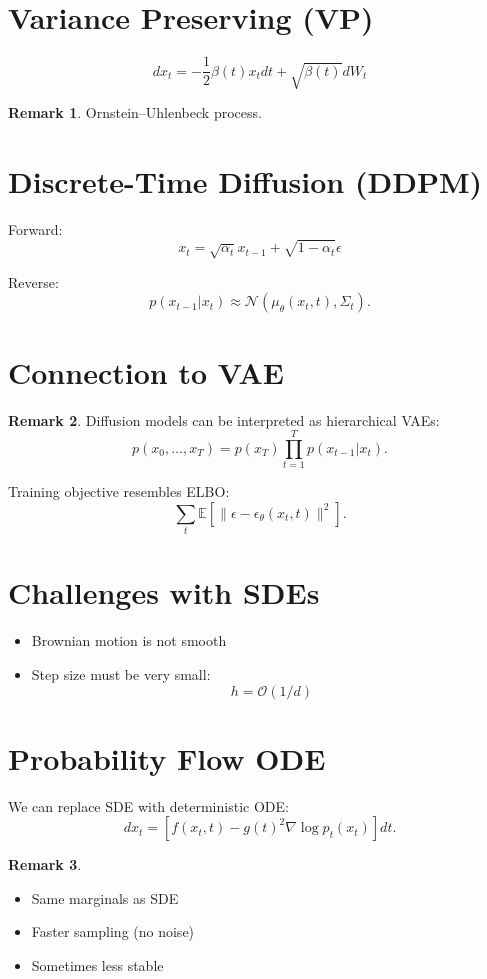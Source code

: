 \documentclass[12pt,oneside]{book}
\numberwithin{equation}{section}
\theoremstyle{definition}
\newtheorem{remark}{Remark}[section]
\theoremstyle{plain}
\theoremstyle{remark}
\newcommand{\E}{\mathbb{E}}
\newcommand{\Normal}{\mathcal{N}}
\begin{document}
\section{Variance Preserving (VP)}

\[
dx_t = -\frac{1}{2}\beta(t)x_t dt + \sqrt{\beta(t)} dW_t
\]

\begin{remark}
Ornstein–Uhlenbeck process.
\end{remark}

\section{Discrete-Time Diffusion (DDPM)}

Forward:
\[
x_t = \sqrt{\alpha_t} x_{t-1} + \sqrt{1-\alpha_t}\epsilon
\]

Reverse:
\[
p(x_{t-1}|x_t)
\approx \Normal(\mu_\theta(x_t,t), \Sigma_t).
\]

\section{Connection to VAE}

\begin{remark}
Diffusion models can be interpreted as hierarchical VAEs:
\[
p(x_0,\dots,x_T) = p(x_T)\prod_{t=1}^T p(x_{t-1}|x_t).
\]
\end{remark}

Training objective resembles ELBO:
\[
\sum_t \E[\| \epsilon - \epsilon_\theta(x_t,t)\|^2].
\]

\section{Challenges with SDEs}

\begin{itemize}
    \item Brownian motion is not smooth
    \item Step size must be very small:
    \[
    h = \mathcal{O}(1/d)
    \]
\end{itemize}

\section{Probability Flow ODE}

We can replace SDE with deterministic ODE:
\[
dx_t = \left[f(x_t,t) - g(t)^2 \nabla \log p_t(x_t)\right] dt.
\]

\begin{remark}
\begin{itemize}
    \item Same marginals as SDE
    \item Faster sampling (no noise)
    \item Sometimes less stable
\end{itemize}
\end{remark}
\end{document}
